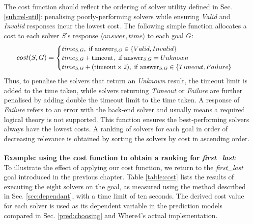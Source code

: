 The cost function should reflect the ordering of solver utility defined in Sec. \ref{sub:rel-util}: penalising poorly-performing solvers while ensuring \textit{Valid} and \textit{Invalid} responses incur the lowest cost.
The following simple function allocates a cost to each solver $S$'s response $\langle answer, time\rangle$ to each goal $G$:
\[\small
cost(S,G) = 
\begin{cases}
time_{S,G}, \text{ if answer}_{S,G} \in \lbrace Valid, Invalid \rbrace \\
time_{S,G} + \text{timeout}, \text{ if answer}_{S,G} = Unknown \\
time_{S,G} + (\text{timeout} \times 2), \text{ if answer}_{S,G} \in \lbrace Timeout, Failure \rbrace
\end{cases}
\]
Thus, to penalise the solvers that return an \textit{Unknown} result, the timeout limit is added to the time taken, while solvers returning \textit{Timeout} or \textit{Failure} are further penalised by 
adding double the timeout limit to the time taken.
A response of \textit{Failure} refers to an error with the back-end solver and usually means a required logical theory is not supported. 
This function ensures the best-performing solvers always have the lowest costs. A ranking of solvers for each goal in order of decreasing relevance is obtained by sorting the solvers by cost in ascending order.\\ 
\\
\textbf{Example: using the cost function to obtain a ranking for \textit{first\_last}}: \\
To illustrate the effect of applying our cost function, we return to the \textit{first\_last} goal introduced in the previous chapter.
Table \ref{table:cost} lists the results of executing the eight solvers on the goal, as measured using the method described in Sec. \ref{sec:dependant}, with a time limit of ten seconds. 
The derived cost value for each solver is used as its dependent variable in the prediction models compared in Sec. \ref{pred:choosing} and \textsf{Where4}'s actual implementation.


